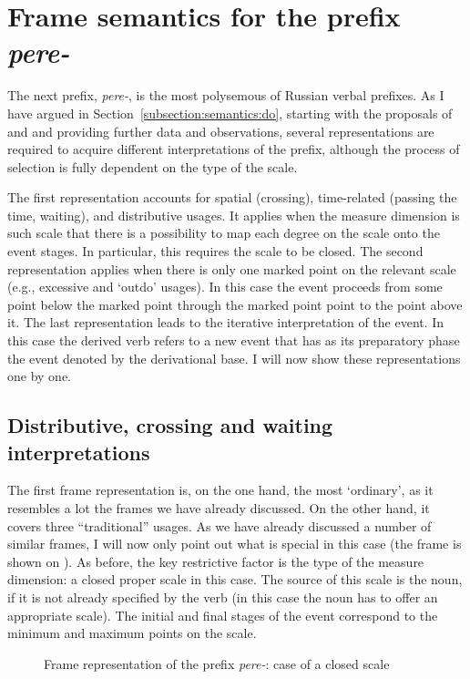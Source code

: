 \section{Frame semantics for the prefix \textit{pere-}}\label{section:frame:pere}
The next prefix, \textit{pere-}, is the most polysemous of Russian verbal prefixes. As I have argued in Section~\ref{subsection:semantics:do}, starting with the proposals of \citet{Demjjanow:97} and \citet{Kagan:book} and providing further data and observations, several representations are required to acquire different interpretations of the prefix, although the process of selection is fully dependent on the type of the scale.

The first representation accounts for spatial (crossing), time-related (passing the time, waiting), and distributive usages. It applies when the measure dimension is such scale that there is a possibility to map each degree on the scale onto the event stages. In particular, this requires the scale to be closed. The second representation applies when there is only one marked point on the relevant scale (e.g., excessive and `outdo' usages). In this case the event proceeds from some point below the marked point through the marked point point to the point above it. The last representation leads to the iterative interpretation of the event. In this case the derived verb refers to a new event that has as its preparatory phase the event denoted by the derivational base. I will now show these representations one by one. 

\subsection{Distributive, crossing and waiting interpretations}
The first frame representation is, on the one hand, the most `ordinary', as it resembles a lot the frames we have already discussed. On the other hand, it covers three ``traditional'' usages. As we have already discussed a number of similar frames, I will now only point out what is special in this case (the frame is shown on ). As before, the key restrictive factor is the type of the measure dimension: a closed proper scale in this case. The source of this scale is the noun, if it is not already specified by the verb (in this case the noun has to offer an appropriate scale). The initial and final stages of the event correspond to the minimum and maximum points on the scale. 
\begin{figure}
\centering
{}
\caption{Frame representation of the prefix \textit{pere-}: case of a closed scale \label{frame:pere:distr}}
\end{figure}

